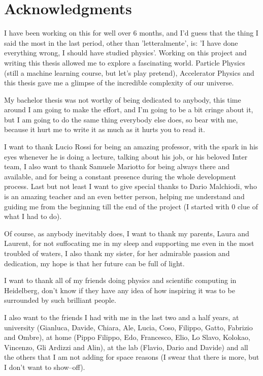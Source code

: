 \chapter*{Acknowledgments}
I have been working on this for well over $6$ months, and I'd guess that the thing I said
the most in the last period, other than 'letteralmente', is: 'I have done everything wrong, I should
have studied physics'. Working on this project and writing this thesis allowed me to explore a
fascinating world. Particle Physics (still a machine learning course, but let's play pretend), Accelerator Physics and this thesis gave me a glimpse of the incredible complexity of our universe.

\smallskip

My bachelor thesis was not worthy of being dedicated to anybody, this time around I am going to make
the effort, and I'm going to be a bit cringe about it, but I am going to do the same thing everybody
else does, so bear with me, because it hurt me to write it as much as it hurts you to read it.

\medskip

I want to thank Lucio Rossi for being an amazing professor, with the spark in his eyes whenever he
is doing a lecture, talking about his job, or his beloved Inter team, I also want to thank Samuele
Mariotto for being always there and available, and for being a constant presence during the whole
development process. Last but not least I want to give special thanks to Dario Malchiodi, who is an
amazing teacher and an even better person, helping me understand and guiding me from the beginning
till the end of the project (I started with $0$ clue of what I had to do).

\smallskip

Of course, as anybody inevitably does, I want to thank my parents, Laura and Laurent, for not
suffocating me in my sleep and supporting me even in the most troubled of waters, I also thank my
sister, for her admirable passion and dedication, my hope is that her future can be full of light.

I want to thank all of my friends doing physics and scientific computing in Heidelberg, don't know
if they have any idea of how inspiring it was to be surrounded by such brilliant people.

I also want to the friends I had with me in the last two and a half years, at university (Gianluca,
Davide, Chiara, Ale, Lucia, Coso, Filippo, Gatto, Fabrizio and Ombre), at home (Pippo Filippo, Edo,
Francesco, Elio, Lo Slavo, Kolokao, Vincenzo, Gli Ardizzi and Alin), at the lab (Flavio,
Dario and Davide) and all the others that I am not adding for space reasons (I swear that there
is more, but I don't want to show--off).


